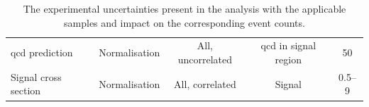 \begin{table}
\begin{tabular*}{\linewidth}{@{\extracolsep{\fill}}lcccc}
        \acrshort{qcd} prediction & Normalisation & All, uncorrelated & \acrshort{qcd} in signal region & 50 \\
        Signal cross section & Normalisation & All, correlated & Signal & 0.5--9 \\
        \bottomrule
    \end{tabular*}
    \caption[The experimental uncertainties present in the analysis with the applicable samples and impact on the corresponding event counts]{The experimental uncertainties present in the analysis with the applicable samples and impact on the corresponding event counts.}
    \label{tab:htoinv_syst_summary}
\end{table}


\clearpage
